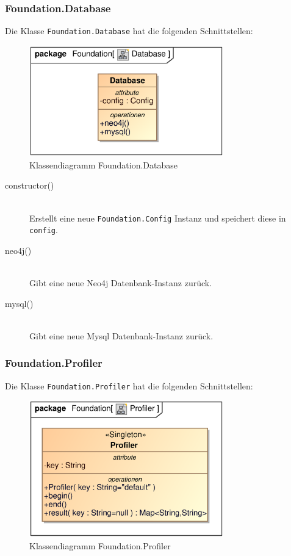 \subsubsection{Foundation.Database}
Die Klasse \verb|Foundation.Database| hat die folgenden Schnittstellen:

\begin{figure}[H]
    \myfloatalign
    \includegraphics[width=0.75\textwidth]{gfx/MtGDeepAnalysis/Database.eps}
    \caption{Klassendiagramm Foundation.Database}
    \label{fig:class:foundation.database}
\end{figure}

\begin{description}
    \item[constructor()] \hfill \\
    Erstellt eine neue \verb|Foundation.Config| Instanz und speichert diese in \verb|config|.
    
    \item[neo4j()] \hfill \\
    Gibt eine neue Neo4j Datenbank-Instanz zurück.
    
    \item[mysql()] \hfill \\
    Gibt eine neue Mysql Datenbank-Instanz zurück.
\end{description}

\subsubsection{Foundation.Profiler}
Die Klasse \verb|Foundation.Profiler| hat die folgenden Schnittstellen:

\begin{figure}[H]
    \myfloatalign
    \includegraphics[width=0.75\textwidth]{gfx/MtGDeepAnalysis/Profiler.eps}
    \caption{Klassendiagramm Foundation.Profiler}
    \label{fig:class:foundation.profiler}
\end{figure}

